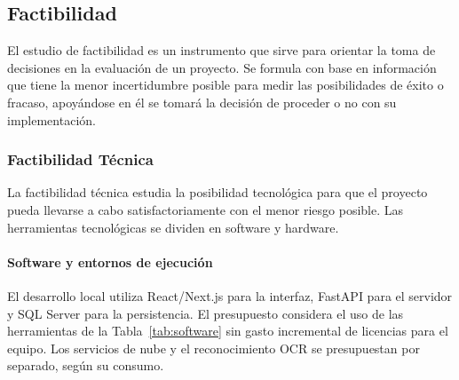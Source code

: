 \subsection{Factibilidad}
 
El estudio de factibilidad es un instrumento que sirve para orientar la toma de decisiones en la evaluación de un proyecto. Se formula con base en información que tiene la menor incertidumbre posible para medir las posibilidades de éxito o fracaso, apoyándose en él se tomará la decisión de proceder o no con su implementación.\cite{miranda2005gestion}

\subsubsection{Factibilidad Técnica}
 
La factibilidad técnica estudia la posibilidad tecnológica para que el proyecto pueda llevarse a cabo satisfactoriamente con el menor riesgo posible. Las herramientas tecnológicas se dividen en software y hardware. \cite[pp.~63--64]{kendall2011analisis}

\paragraph{Software y entornos de ejecución}

El desarrollo local utiliza React/Next.js para la interfaz, FastAPI para el servidor y SQL Server para la persistencia. El presupuesto considera el uso de las herramientas de la Tabla~\ref{tab:software} sin gasto incremental de licencias para el equipo. Los servicios de nube y el reconocimiento OCR se presupuestan por separado, según su consumo.

